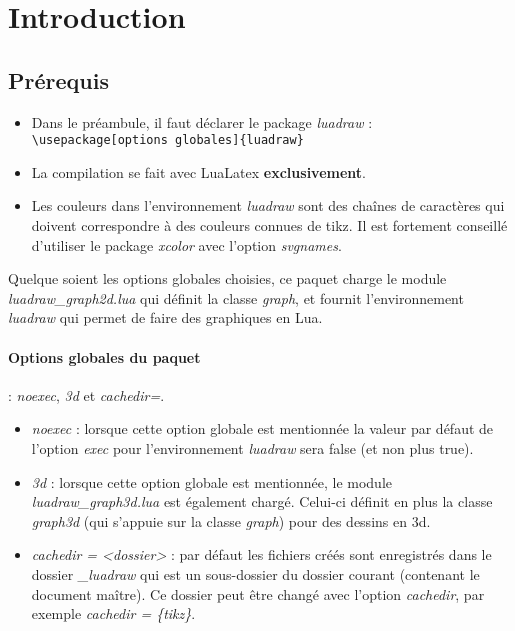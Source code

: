 \section{Introduction}


\subsection{Prérequis}

\begin{itemize}
\item Dans le préambule, il faut déclarer le package \emph{luadraw} : \verb|\usepackage[options globales]{luadraw}|
\item La compilation se fait avec LuaLatex \textbf{exclusivement}.
\item Les couleurs dans l'environnement \emph{luadraw} sont des chaînes de caractères qui doivent correspondre à des couleurs connues de tikz. Il est fortement conseillé d'utiliser le package \emph{xcolor} avec l'option \emph{svgnames}.
\end{itemize}

Quelque soient les options globales choisies, ce paquet charge le module \emph{luadraw\_graph2d.lua} qui définit la classe \emph{graph}, et fournit l'environnement \emph{luadraw} qui permet de faire des graphiques en Lua.

\paragraph{Options globales du paquet} : \emph{noexec}, \emph{3d} et \emph{cachedir=}.

\begin{itemize}
    \item \emph{noexec} : lorsque cette option globale est mentionnée la valeur par défaut de l'option \emph{exec} pour l'environnement \emph{luadraw} sera false (et non plus true).
    \item \emph{3d} : lorsque cette option globale est mentionnée, le module \emph{luadraw\_graph3d.lua} est également chargé. Celui-ci définit en plus la classe \emph{graph3d} (qui s'appuie sur la classe \emph{graph}) pour des dessins en 3d. 
    \item \emph{cachedir = <dossier>} : par défaut les fichiers créés sont enregistrés dans le dossier \emph{\_luadraw} qui est un sous-dossier du dossier courant (contenant le document maître). Ce dossier peut être changé avec l'option \emph{cachedir}, par exemple \emph{cachedir = \{tikz\}}.
\end{itemize}

